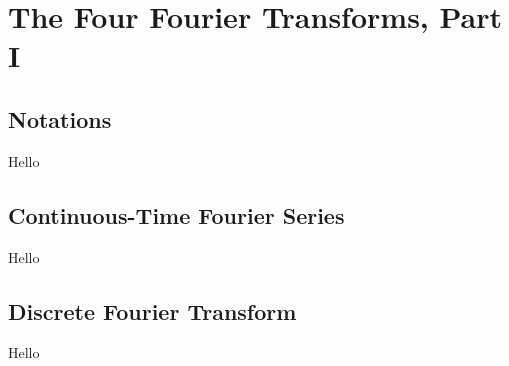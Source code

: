 \chapter{The Four Fourier Transforms, Part I}

\section*{Notations}
Hello

\section{Continuous-Time Fourier Series}
Hello

\section{Discrete Fourier Transform}
Hello
